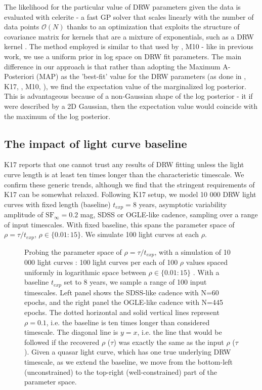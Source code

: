 \documentclass[twocolumn]{aastex62}
\newcommand{\project}[1]{\textsf{#1}}
\begin{document}
The likelihood for the particular value of DRW parameters given the data is evaluated with   \project{celerite} \citep{foreman2017} - a fast GP solver that scales linearly with the number of data points $\mathcal{O}(N)$ thanks to an optimization that exploits the structure of covariance matrix for kernels that are a mixture of exponentials, such as a DRW kernel \citep{foreman2018,ambikasaran2015}. The method employed is similar to that used by \cite{rybicki1992, kozlowski2010},  M10 - like in previous work, we use a  uniform prior in log space on DRW fit parameters. The main difference in our approach is that rather than adopting the Maximum A-Posteriori (MAP) as the 'best-fit' value for the DRW parameters (as done in \citealt{kozlowski2010}, K17, \citealt{kozlowski2016b}, M10, \citealt{macleod2011}),  we find the expectation value of the marginalized log posterior. This is advantageous because of a non-Gaussian shape of the log posterior - it if were described by a 2D Gaussian,  then the expectation value would coincide with the maximum of the log posterior.

\subsection{The impact of light curve baseline}\label{sec:baseline}

K17 reports that one cannot trust any results of DRW fitting unless the light curve length is at least ten times longer than the characteristic timescale. We confirm these generic trends, although we find that the stringent requirements of K17 can be somewhat relaxed. Following K17 setup,  we  model 10 000  DRW light curves with fixed length (baseline) $t_{exp}=8$ years, asymptotic variability amplitude of  $\mathrm{SF}_{\infty} = 0.2$ mag, SDSS or OGLE-like cadence, sampling over a range of input timescales. With fixed baseline, this spans the parameter space of $\rho = \tau / t_{exp}$, $\rho \in   \{ 0.01 : 15\}$. We simulate 100 light curves at each $\rho$. 

\begin{figure*}
\caption{Probing the parameter space of $\rho = \tau / t_{exp}$, with a simulation of  10 000 light curves : 100 light curves per each of 100 $\rho$ values spaced uniformly in logarithmic space between $\rho \in   \{ 0.01 : 15\}$ . With a baseline $t_{exp}$ set to 8 years,  we sample a range of 100 input timescales. Left panel shows the SDSS-like cadence with N=60 epochs, and the right panel the OGLE-like cadence with N=445 epochs. The dotted horizontal and solid vertical lines represent $\rho = 0.1$, i.e. the baseline is ten times longer than considered timescale. The diagonal line is $y=x$, i.e. the line that would be followed if the recovered  $\rho$ ($\tau$) was exactly the same as the input $\rho$ ($\tau$). Given a quasar light curve, which has one true underlying DRW timescale,  as we extend the baseline, we move from the bottom-left (unconstrained) to the top-right (well-constrained) part of the parameter space. } 
\label{fig:rho_space}
\end{figure*}
\end{document}
